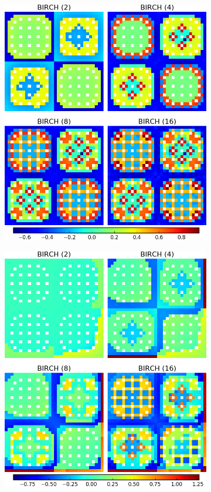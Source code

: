 \documentclass[12pt,twoside]{mitthesis-exec}
\begin{document}
\begin{figure}[h!]
\centering
\begin{subfigure}{0.49\textwidth}
  \centering
\includegraphics[width=0.95\linewidth]{figures/results/compare/2x2/compare-capt}
  \caption{}
  \label{fig:refl-capt-rates-comp-refl}
\end{subfigure} %
\begin{subfigure}{0.49\textwidth}
  \centering
\includegraphics[width=0.95\linewidth]{figures/results/compare/reflector/compare-capt}

\end{subfigure}
\end{figure}
\end{document}

